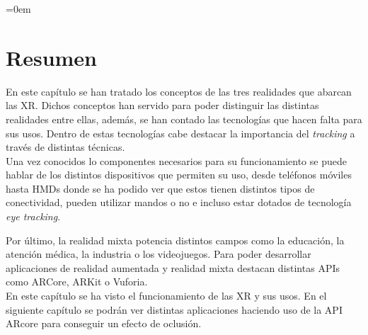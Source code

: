 \parindent=0em
\section*{Resumen}
\noindent

En este capítulo se han tratado los conceptos de las tres realidades que abarcan las XR. Dichos conceptos han servido para poder distinguir las distintas realidades entre ellas, además, se han contado las tecnologías que hacen falta para sus usos. Dentro de estas tecnologías cabe destacar la importancia del \textit{tracking} a través de distintas técnicas.\\

Una vez conocidos lo componentes necesarios para su funcionamiento se puede hablar de los distintos dispositivos que permiten su uso, desde teléfonos móviles hasta HMDs donde se ha podido ver que estos tienen distintos tipos de conectividad, pueden utilizar mandos o no e incluso estar dotados de tecnología \textit{eye tracking}.

Por último, la realidad mixta potencia distintos campos como la educación, la atención médica, la industria o los videojuegos. Para poder desarrollar aplicaciones de realidad aumentada y realidad mixta destacan distintas APIs como ARCore, ARKit o Vuforia.\\

En este capítulo se ha visto el funcionamiento de las XR y sus usos. En el siguiente capítulo se podrán ver distintas aplicaciones haciendo uso de la API ARcore para conseguir un efecto de oclusión.